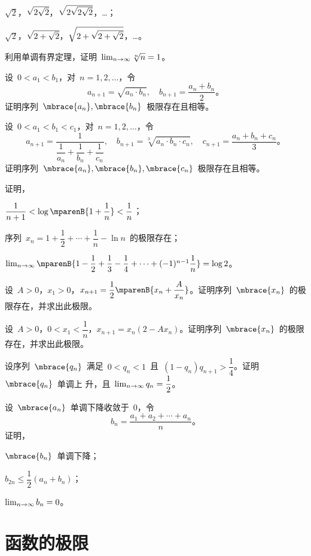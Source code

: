 \begin{exercise}
\begin{exlistcols}
  \item $\sqrt2$，$\smsqrt{2\sqrt2}$，$\sqrt{2\smsqrt{2\sqrt2}}$，\ldots ；
  \item $\sqrt2$，$\smsqrt{2+\sqrt2}$，$\sqrt{2+\smsqrt{2+\sqrt2}}$，\ldots 。
\end{exlistcols}
\item 利用单调有界定理，证明~$\lim_{n\to\infty}\sqrt[n]n=1$。
\item 设~$0<a_1<b_1$，对~$n=1,2,\dotsc$，令
\[
  a_{n+1}=\sqrt{a_n\cdot b_n},\quad b_{n+1}=\frac{a_n+b_n}2。
\]
证明序列~$\mbrace{a_n},\mbrace{b_n}$~极限存在且相等。
\item 设~$0<a_1<b_1<c_1$，对~$n=1,2,\dotsc$，令
\[
  a_{n+1}=\frac1{\dfrac1{a_n}+\dfrac1{b_n}+\dfrac1{c_n}},\quad
  b_{n+1}=\sqrt[3]{a_n\cdot b_n\cdot c_n},\quad
  c_{n+1}=\frac{a_n+b_n+c_n}3。
\]
证明序列~$\mbrace{a_n},\mbrace{b_n},\mbrace{c_n}$~极限存在且相等。
\item 证明，
\begin{exlistcols}
  \item $\dfrac1{n+1}<\ln\mparenB{1+\dfrac1n}<\dfrac1n$；
  \item 序列~$x_n=1+\dfrac12+\dotsb+\dfrac1n-\ln n$~的极限存在；
  \item $\lim_\ntoinf\mparenB{1-\dfrac12+\dfrac13-\dfrac14+\dotsb+(-1)^{n-1}\dfrac1n}=\ln2$。
\end{exlistcols}
\item 设~$A>0$，$x_1>0$，$x_{n+1}=\dfrac12\mparenB{x_n+\dfrac A{x_n}}$。证明序列~$\mbrace{x_n}$~的极限存在，并求出此极限。
\item 设~$A>0$，$0<x_1<\dfrac1n$，$x_{n+1}=x_n(2-Ax_n)$。证明序列~$\mbrace{x_n}$~的极限存在，并求出此极限。
\item 设序列~$\mbrace{q_n}$~满足~$0<q_n<1$~且~$(1-q_n)q_{n+1}>\dfrac14$。证明~$\mbrace{q_n}$~单调上
升，且~$\lim_{n\to\infty} q_n=\dfrac12$。
\item 设~$\mbrace{a_n}$~单调下降收敛于~$0$，令
\[
  b_n=\frac{a_1+a_2+\dotsb+a_n}n。
\]
证明，
\begin{exlistcols}[3]
  \item $\mbrace{b_n}$~单调下降；
  \item $b_{2n}\leq\dfrac12(a_n+b_n)$；
  \item $\lim_{n\to\infty} b_n=0$。
\end{exlistcols}
\end{exercise}

\section{函数的极限}

